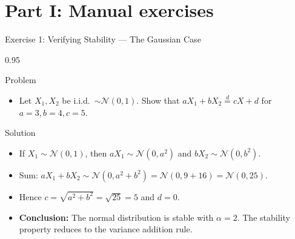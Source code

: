 \documentclass[9pt, aspectratio=169, t]{beamer}
\begin{document}
\section{Part I: Manual exercises}

\begin{frame}{Exercise 1: Verifying Stability --- The Gaussian Case}
    \begin{cminipage}{0.95\textwidth}
\begin{block}{Problem}
\begin{itemize}\setlength{\itemsep}{0pt}
    \item Let $X_1, X_2$ be i.i.d.\ $\sim \mathcal{N}(0, 1)$. Show that
$a X_1 + b X_2 \stackrel{d}{=} c X + d$ for $a=3, b=4, c=5$.
\end{itemize}
\end{block}

\begin{exampleblock}{Solution}
\begin{itemize}\setlength{\itemsep}{0pt}
    \item If $X_1 \sim \mathcal{N}(0, 1)$, then $aX_1 \sim \mathcal{N}(0, a^2)$ and $bX_2 \sim \mathcal{N}(0, b^2)$.
    \item Sum: $aX_1 + bX_2 \sim \mathcal{N}(0, a^2 + b^2) = \mathcal{N}(0, 9 + 16) = \mathcal{N}(0, 25)$.
    \item Hence $c = \sqrt{a^2 + b^2} = \sqrt{25} = 5$ and $d = 0$.
    \item \textbf{Conclusion:} The normal distribution is stable with $\alpha = 2$. The stability property reduces to the variance addition rule.
\end{itemize}
\end{exampleblock}
    \end{cminipage}
\end{frame}
\end{document}
